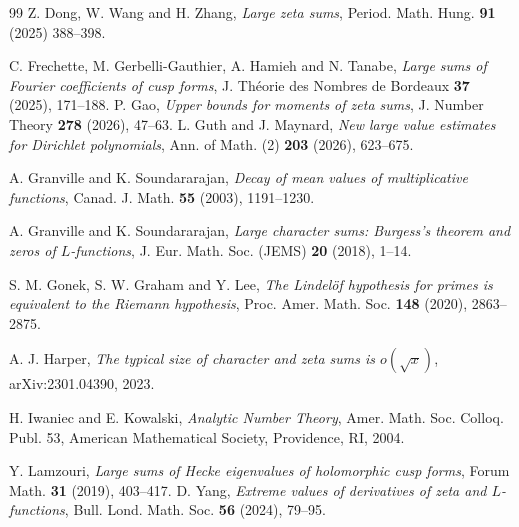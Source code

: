\documentclass[12pt,reqno]{amsart}
\theoremstyle{remark}
\numberwithin{equation}{section}
\begin{document}
\begin{thebibliography}{99}
Z. Dong, W. Wang and H. Zhang,
\emph{Large zeta sums}, Period. Math. Hung. \textbf{91} (2025)  388--398. 

C. Frechette, M. Gerbelli-Gauthier, A. Hamieh and N. Tanabe, \emph{Large sums of Fourier coefficients of cusp forms}, J. Théorie des Nombres de Bordeaux \textbf{37} (2025),  171--188.
P. Gao,
\emph{Upper bounds for moments of zeta sums},
J. Number Theory \textbf{278} (2026), 47--63.
L. Guth and J. Maynard,
\emph{New large value estimates for Dirichlet polynomials},
Ann. of Math. (2) \textbf{203} (2026), 623--675.

A. Granville and K. Soundararajan,
\emph{Decay of mean values of multiplicative functions},
Canad. J. Math. \textbf{55} (2003), 1191--1230.

A. Granville and K. Soundararajan,
\emph{Large character sums: Burgess's theorem and zeros of $L$-functions},
J. Eur. Math. Soc. (JEMS) \textbf{20} (2018), 1--14.

S. M. Gonek, S. W. Graham and Y. Lee,
\emph{The Lindel\"of hypothesis for primes is equivalent to the Riemann hypothesis},
Proc. Amer. Math. Soc. \textbf{148} (2020), 2863--2875.

A. J. Harper,
\emph{The typical size of character and zeta sums is $o(\sqrt{x})$},
arXiv:2301.04390, 2023.



H. Iwaniec and E. Kowalski,
\emph{Analytic Number Theory},
Amer. Math. Soc. Colloq. Publ. 53, American Mathematical Society, Providence, RI, 2004.

Y. Lamzouri,
\emph{Large sums of Hecke eigenvalues of holomorphic cusp forms},
Forum Math. \textbf{31} (2019), 403--417.
D. Yang,
\emph{Extreme values of derivatives of zeta and $L$-functions},
Bull. Lond. Math. Soc. \textbf{56} (2024), 79--95.



\end{thebibliography}
\end{document}
